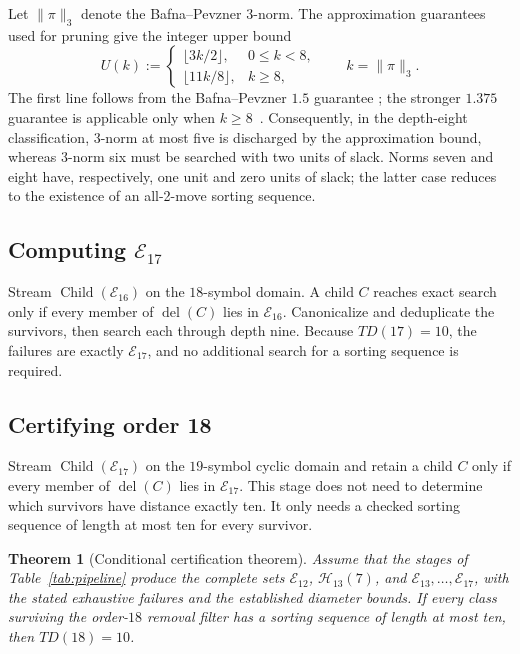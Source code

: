 \documentclass[11pt]{article}
\newtheorem{theorem}{Theorem}[section]
\theoremstyle{definition}
\theoremstyle{remark}
\newcommand{\En}{\mathcal E}
\newcommand{\Hn}{\mathcal H}
\newcommand{\Del}{\operatorname{del}}
\newcommand{\Child}{\operatorname{Child}}
\begin{document}
Let $\lVert\pi\rVert_3$ denote the Bafna--Pevzner 3-norm.  The approximation
guarantees used for pruning give the integer upper bound
\[
 U(k):=
 \begin{cases}
   \lfloor 3k/2\rfloor, & 0\leq k<8,\\
   \lfloor 11k/8\rfloor, & k\geq8,
 \end{cases}
 \qquad k=\lVert\pi\rVert_3.
\]
The first line follows from the Bafna--Pevzner $1.5$ guarantee
\cite{BafnaPevzner1998}; the stronger $1.375$ guarantee is applicable only
when $k\geq8$~\cite{EliasHartman2006}.  Consequently, in the depth-eight
classification, 3-norm at most five is discharged by the approximation bound,
whereas 3-norm six must be searched with two units of slack.  Norms seven and
eight have, respectively, one unit and zero units of slack; the latter case
reduces to the existence of an all-2-move sorting sequence.

\subsection{Computing \texorpdfstring{$\En_{17}$}{E17}}

Stream $\Child(\En_{16})$ on the $18$-symbol domain.  A child $C$ reaches
exact search only if every member of $\Del(C)$ lies in $\En_{16}$.
Canonicalize and deduplicate the survivors, then search each through depth
nine.  Because $TD(17)=10$, the failures are exactly $\En_{17}$, and no
additional search for a sorting sequence is required.

\subsection{Certifying order 18}

Stream $\Child(\En_{17})$ on the $19$-symbol cyclic domain and retain a
child $C$ only if every member of $\Del(C)$ lies in $\En_{17}$.  This stage
does not need to determine which survivors have distance exactly ten.  It
only needs a checked sorting sequence of length at most ten for every survivor.

\begin{theorem}[Conditional certification theorem]\label{thm:conditional}
Assume that the stages of Table~\ref{tab:pipeline} produce the complete sets
$\En_{12}$, $\Hn_{13}(7)$, and $\En_{13},\ldots,\En_{17}$, with the stated
exhaustive failures and the established diameter bounds.  If every class surviving the
order-$18$ removal filter has a sorting sequence of length at most ten, then
$TD(18)=10$.
\end{theorem}
\end{document}
